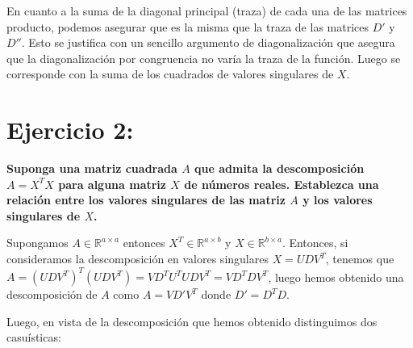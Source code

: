 \documentclass{article}
\begin{document}
	En cuanto a la suma de la diagonal principal (traza) de cada una de las matrices producto, podemos asegurar que es la misma que la traza de las matrices $D'$ y $D''$. Esto se justifica con un sencillo argumento de diagonalización que asegura que la diagonalización por congruencia no varía la traza de la función. Luego se corresponde con la suma de los cuadrados de valores singulares de $X$.
		
 
 \newpage
 
\section{Ejercicio 2:}
\textbf{Suponga una matriz cuadrada $A$ que admita la descomposición $A = X^TX$ para alguna matriz $X$ de números reales. Establezca una relación entre los valores singulares de las matriz $A$ y los valores singulares de $X$.}

	Supongamos $A \in \mathbb{R}^{a \times a}$ entonces $X^T \in \mathbb{R}^{a \times b}$ y $X \in \mathbb{R}^{b \times a}$. Entonces, si consideramos la descomposición en valores singulares $X = UDV^T$, tenemos que $A = (UDV^T)^T(UDV^T) = V D^TU^TUDV^T = VD^TDV^T$, luego hemos obtenido una descomposición de $A$ como $A = V D' V^T$ donde $D' = D^T D$. 
	
	
	Luego, en vista de la descomposición que hemos obtenido distinguimos dos casuísticas: 
	
\end{document}
